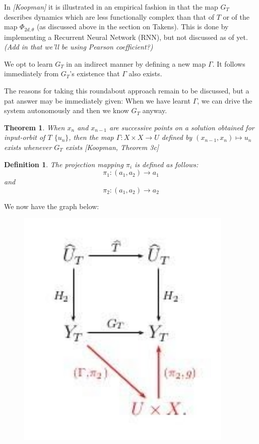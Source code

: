 \documentclass[12 pt]{article}
\newtheorem{Definition}{Definition}[]
\newtheorem{Theorem}{Theorem}[]
\begin{document}
In \emph{[Koopman]} it is illustrated in an empirical fashion in that the map $G_T$ describes dynamics which are less functionally complex than that of $T$ or of the map $\Phi_{2d,\theta}$ (as discussed above in the section on Takens). This is done by implementing a Recurrent Neural Network (RNN), but not discussed as of yet. \emph{(Add in that we'll be using Pearson coefficient?)}
 
We opt to learn $G_T$ in an indirect manner by defining a new map $\Gamma$. It follows immediately from $G_T$’s existence that $\Gamma$ also exists. 

The reasons for taking this roundabout approach remain to be discussed, but a pat answer may be immediately given: When we have learnt $\Gamma$, we can drive the system autonomously and then we know $G_T$ anyway.

\begin{Theorem}
  When $x_n$ and $x_{n-1}$ are successive points on a solution obtained for input-orbit of $T$ $\{u_n\}$, then the map $\Gamma: X\times{X}\to{U}$ defined by $(x_{n-1},x_n)\mapsto{u_n}$ exists whenever $G_T$ exists [Koopman, Theorem 3c] 
\end{Theorem}

\begin{Definition}
 The projection mapping $\pi_i$ is defined as follows: $$\pi_1:(a_1,a_2)\to{a_1}$$ and $$\pi_2:(a_1,a_2)\to{a_2}$$ 
\end{Definition}

We now have the graph below:

\begin{figure}[ht]
  \includegraphics[scale=0.3]{gammatemp.png}
  \centering
  \label{fig:conjugacy_with_Gamma}
\end{figure}
\end{document}
